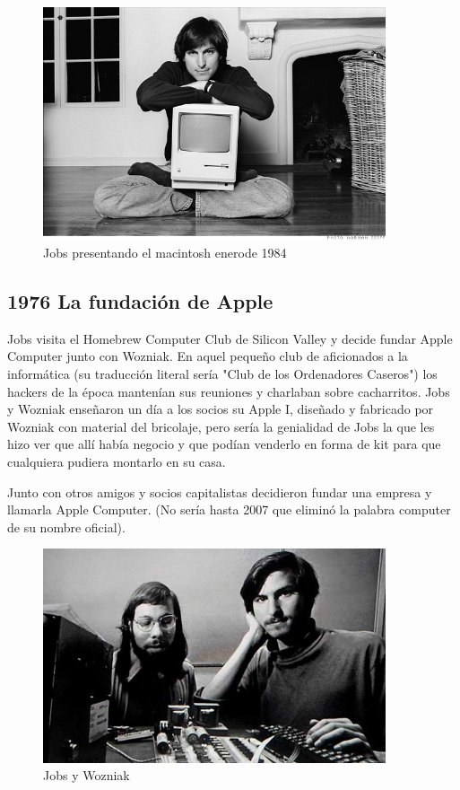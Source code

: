 \documentclass[notumble,10pt,a4paper]{leaflet}
\begin{document}
\begin{figure}[h!]
	\centering
	\includegraphics[width=0.9\textwidth]{img/steve-macintosh.jpg}
	\caption{Jobs presentando el macintosh enerode 1984}
\end{figure}

\newpage
\subsection{\large{1976 La fundación de Apple}}
Jobs visita el Homebrew Computer Club de Silicon Valley y decide fundar Apple Computer junto con Wozniak. En aquel pequeño club de aficionados a la informática (su traducción literal sería "Club de los Ordenadores Caseros") los hackers de la época mantenían sus reuniones y charlaban sobre cacharritos\cite{wiki:stevejobs}.
Jobs y Wozniak enseñaron un día a los socios su Apple I, diseñado y fabricado por Wozniak con material del bricolaje, pero sería la genialidad de Jobs la que les hizo ver que allí había negocio y que podían venderlo en forma de kit para que cualquiera pudiera montarlo en su casa.

Junto con otros amigos y socios capitalistas decidieron fundar una empresa y llamarla Apple Computer. (No sería hasta 2007 que eliminó la palabra computer de su nombre oficial).

\begin{figure}[b]
	\centering
	\includegraphics[width=0.9\textwidth]{img/apple.jpg}
	\caption{Jobs y Wozniak}
\end{figure}
\end{document}
